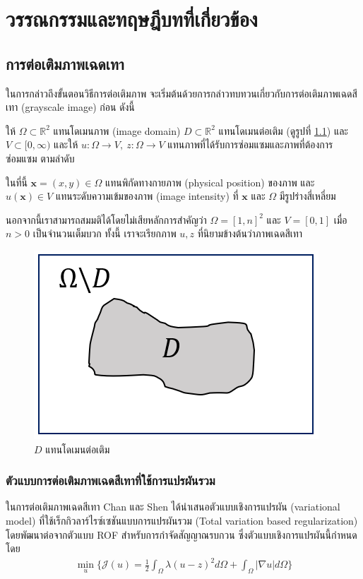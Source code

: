 \chapter{วรรณกรรมและทฤษฎีบทที่เกี่ยวข้อง}
\section{การต่อเติมภาพเฉดเทา}

\hspace{1cm} ในการกล่าวถึงขั้นตอนวิธีการต่อเติมภาพ จะเริ่มต้นด้วยการกล่าวทบทวนเกี่ยวกับการต่อเติมภาพเฉดสีเทา (grayscale image) ก่อน ดังนี้

\hspace{1cm} ให้ $\Omega \subset \mathbb{R}^2$ แทนโดเมนภาพ (image domain) $D \subset \mathbb{R}^2$ แทนโดเมนต่อเติม (ดูรูปที่ \ref{image:sample-domain}) และ $V \subset [0,\infty)$ และให้ $ u: \Omega \rightarrow V,\ z: \Omega \rightarrow V$ แทนภาพที่ได้รับการซ่อมแซมและภาพที่ต้องการซ่อมแซม ตามลำดับ

\hspace{1cm} ในที่นี้ $ \mathbf{x} = (x,y) \in \Omega $ แทนพิกัดทางกายภาพ (physical position) ของภาพ และ $ u(\mathbf{x}) \in V $ แทนระดับความเข้มของภาพ (image intensity) ที่ $ \mathbf{x} $ และ $ \Omega $ มีรูปร่างสี่เหลี่ยม 

\hspace{1cm} นอกจากนี้เราสามารถสมมติได้โดยไม่เสียหลักการสำคัญว่า $ \Omega = [1,n]^2 $ และ $ V = [0,1] $ เมื่อ $n>0$ เป็นจำนวนเต็มบวก ทั้งนี้ เราจะเรียกภาพ $u,z$ ที่นิยามข้างต้นว่าภาพเฉดสีเทา
\begin{figure}[H]
	\centering
	\includegraphics[width=0.375\linewidth]{image/sample-domain.png}
	\caption{$D$ แทนโดเมนต่อเติม}
	\label{image:sample-domain}
\end{figure}

\subsection{ตัวแบบการต่อเติมภาพเฉดสีเทาที่ใช้การแปรผันรวม}\label{inpaint-model-grayscale}

\hspace{1cm} ในการต่อเติมภาพเฉดสีเทา Chan และ Shen \cite{ref:rof-inpaint-chan-shen} ได้นำเสนอตัวแบบเชิงการแปรผัน (variational model) ที่ใช้เร็กกิวลาร์ไรซ์เซชันแบบการแปรผันรวม (Total variation based regularization) โดยพัฒนาต่อจากตัวแบบ ROF สำหรับการกำจัดสัญญาณรบกวน \cite{ref:ROF-template} ซึ่งตัวแบบเชิงการแปรผันนี้กำหนดโดย
\begin{align}
    \min_{u} \{ \mathcal{J}(u) = \frac{1}{2} \int_{\Omega}\lambda (u-z)^2 d\Omega +  \int_{\Omega}  |\nabla u|  d\Omega \}
\label{e1}
\end{align}

